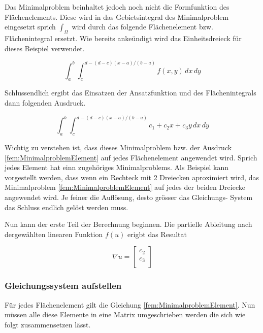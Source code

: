 Das Minimalproblem beinhaltet jedoch noch nicht die Formfunktion des Flächenelements. Diese wird in das Gebietsintegral des Minimalproblem eingesetzt sprich $\int_{\Omega}$ wird durch das folgende Flächenelement bzw. Flächenintegral ersetzt. Wie bereits ankeündigt wird das Einheitsdreieck für dieses Beispiel verwendet.

\begin{equation}
\int_a^b \int_c^{d-(d-c)(x-a)/(b-a)} f(x,y) \, dx\,dy
\label{fem:FlaecheDreieck}
\end{equation}

Schlussendlich ergibt das Einsatzen der Ansatzfunktion und des Flächenintegrals dann folgenden Ausdruck.

\begin{equation}
\int_a^b \int_c^{d-(d-c)(x-a)/(b-a)} c_1 + c_2x + c_3y \, dx \, dy
\label{fem:MinimalproblemElement}
\end{equation}

Wichtig zu verstehen ist, dass dieses Minimalproblem bzw. der Ausdruck \ref{fem:MinimalproblemElement} auf jedes Flächenelement angewendet wird. Sprich jedes Element hat einn zugehöriges Minimalproblems. Als Beispiel kann vorgestellt werden, dass wenn ein Rechteck mit 2 Dreiecken aproximiert wird, das Minimalproblem \ref{fem:MinimalproblemElement} auf jedes der beiden Dreiecke angewendet wird. Je feiner die Auflösung, desto grösser das Gleichungs- System das Schluss endlich gelöst werden muss.

Nun kann der erste Teil der Berechnung beginnen. Die partielle Ableitung nach dergewählten linearen Funktion $f(u)$ erigbt das Resultat

\begin{equation}
	\nabla u = 	
	\left[ \begin{array}{r}
	c_2  \\
	c_3 \\
	\end{array}\right]
	\label{fem:equationSchwarzquadratischP}
\end{equation} 

\subsubsection{Gleichungssystem aufstellen }

Für jedes Flächenelement gilt die Gleichung \ref{fem:MinimalproblemElement}. Nun müssen alle diese Elemente in eine Matrix umgeschrieben werden die sich wie folgt zusammensetzen lässt.


